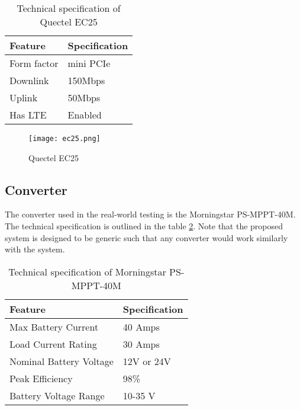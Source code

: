 \documentclass[../thesis.tex]{subfiles}
\begin{document}
\begin{table}[h!]
	\begin{center}
		\caption{Technical specification of Quectel EC25}
		\label{tab:quectelEC25}
		\begin{tabular}{l|l}
			\toprule
			\textbf{Feature} & \textbf{Specification}\\
			\midrule
			Form factor & mini PCIe\\
			Downlink & 150Mbps\\
			Uplink & 50Mbps\\
			Has LTE & Enabled\\ 
			\bottomrule
		\end{tabular}
	\end{center}
\end{table}

\begin{figure}[!ht]
	\centering
	\texttt{[image: ec25.png]}
	\caption{Quectel EC25 \cite{Quectel}}
	\label{fig:quectelEC25}
\end{figure}

\subsection{Converter}

The converter used in the real-world testing is the Morningstar PS-MPPT-40M. The technical specification is outlined in the table \ref{tab:psmppt40m}. Note that the proposed system is designed to be generic such that any converter would work similarly with the system. 

\begin{table}[h!]
	\begin{center}
		\caption{Technical specification of Morningstar PS-MPPT-40M}
		\label{tab:psmppt40m}
		\begin{tabular}{l|l}
			\toprule
			\textbf{Feature} & \textbf{Specification}\\
			\midrule
			Max Battery Current & 40 Amps\\
			Load Current Rating & 30 Amps\\
			Nominal Battery Voltage & 12V or 24V\\
			Peak Efficiency & 98\%\\ 
			Battery Voltage Range & 10-35 V\\ 
			\bottomrule
		\end{tabular}
	\end{center}
\end{table}
\end{document}
